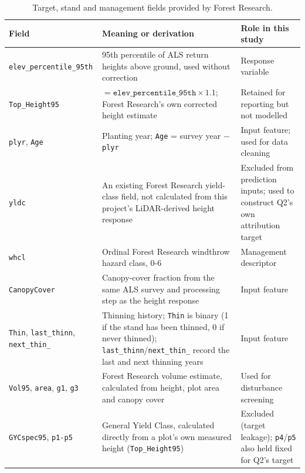 \documentclass[logo,msc,ai]{infthesis}           %
\begin{document}
\begin{table}[!htbp]
\scriptsize

\setlength{\tabcolsep}{3pt}
\renewcommand{\arraystretch}{0.95}
\begin{tabular}{
    >{\raggedright\arraybackslash}p{2.6cm}
    >{\raggedright\arraybackslash}p{7.0cm}
    >{\raggedright\arraybackslash}p{3.2cm}
}
\hline
Field & Meaning or derivation & Role in this study \\
\hline
\texttt{elev\_\allowbreak percentile\_\allowbreak 95th} & 95th percentile of ALS return heights above ground, used without correction & Response variable \\
\texttt{Top\_Height95} & $=\texttt{elev\_percentile\_95th}\times1.1$; Forest Research's own corrected height estimate & Retained for reporting but not modelled \\
\texttt{plyr}, \texttt{Age} & Planting year; \texttt{Age} = survey year $-$ \texttt{plyr} & Input feature; used for data cleaning \\
\texttt{yldc} & An existing Forest Research yield-class field, not calculated from this project's LiDAR-derived height response & Excluded from prediction inputs; used to construct Q2's own attribution target \\
\texttt{whcl} & Ordinal Forest Research windthrow hazard class, 0-6 & Management descriptor \\
\texttt{CanopyCover} & Canopy-cover fraction from the same ALS survey and processing step as the height response & Input feature \\
\texttt{Thin}, \texttt{last\_thinn}, \texttt{next\_thin\_} & Thinning history; \texttt{Thin} is binary (1 if the stand has been thinned, 0 if never thinned); \texttt{last\_thinn}/\texttt{next\_thin\_} record the last and next thinning years & Input feature \\
\texttt{Vol95}, \texttt{area}, \texttt{g1}, \texttt{g3} & Forest Research volume estimate, calculated from height, plot area and canopy cover & Used for disturbance screening \\
\texttt{GYCspec95}, \texttt{p1-p5} & General Yield Class, calculated directly from a plot's own measured height (\texttt{Top\_Height95}) & Excluded (target leakage); \texttt{p4}/\texttt{p5} also held fixed for Q2's target \\
\hline
\end{tabular}
\caption{\small{Target, stand and management fields provided by Forest Research.}}
\label{tab:data-fields}
\end{table}
\end{document}
